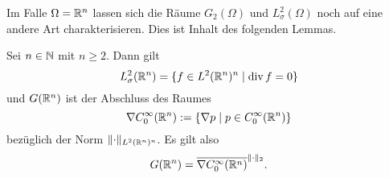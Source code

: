 Im Falle $\Omega = \mathbb{R}^n$ lassen sich die Räume $G_2(\Omega)$ und $L_\sigma^2(\Omega)$ noch auf eine andere Art charakterisieren.
Dies ist Inhalt des folgenden Lemmas.

\begin{lem}
  Sei $n \in \mathbb{N}$ mit $n \geq 2$.
  Dann gilt
  \begin{equation}
    \label{eq:LCharacterization}
    L_\sigma^2(\mathbb{R}^n) = \{ f \in L^2(\mathbb{R}^n)^n \mid \mathrm{div\,} f = 0 \}
  \end{equation}
  und $G(\mathbb{R}^n)$ ist der Abschluss des Raumes
  $$
  \nabla C_0^\infty(\mathbb{R}^n) := \{ \nabla p \mid p \in C_0^\infty(\mathbb{R}^n) \}
  $$
  bezüglich der Norm $\lVert \cdot \rVert_{L^2(\mathbb{R}^n)^n}$.
  Es gilt also
  \begin{equation}
    \label{eq:GCharacterization}
    G(\mathbb{R}^n) = \overline{\nabla C_0^\infty(\mathbb{R}^n)}^{\lVert \cdot \rVert_2}.
  \end{equation}
\end{lem}

